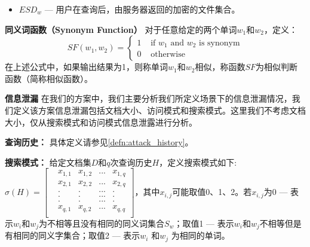 \begin{itemize}
  \item
  $ ESD_w $ --- 用户在查询后，由服务器返回的加密的文件集合。


\end{itemize}

%
%
\textbf{同义词函数（Synonym Function）} 对于任意给定的两个单词$w_1$和$w_2$，定义：
\begin{equation}
SF(w_1, w_2) =
\begin{cases}
1 & \text{ if ${w_1}$ and ${w_2}$ is synonym}
\\
0 & \text{ otherwise }
\end{cases}
\end{equation}
在上述公式中，如果输出结果为1，则称单词$w_1$和$w_2$相似，称函数$SF$为相似判断函数（简称相似函数）。

%
%



%
%
\textbf{信息泄漏} 在我们的方案中，我们主要分析我们所定义场景下的信息泄漏情况，我们定义该方案信息泄漏包括文档大小、访问模式和搜索模式。这里我们不考虑文档大小，仅从搜索模式和访问模式信息泄露进行分析。

\textbf{查询历史：} 具体定义请参见\ref{defn:attack_history}。

\textbf{搜索模式：} 给定文档集$D$和$q$次查询历史$H$，定义搜索模式如下:\\
 $\sigma(H) = \begin{bmatrix}
 &x_{1,1}  &x_{1,2}  &...  &x_{1,q} \\
 &x_{2,1}  &x_{2,2}  &...  &x_{2,q} \\
 & . & .   &...      &. \\
 & . & .   &...      &. \\
 & . & .   &...      &. \\
 &x_{q,1}  &x_{q,2}  &...  &x_{q,q} \\
\end{bmatrix}$，其中$x_{i,j}$可能取值0、1、2。若$x_{i,j}$为0 --- 表示$w_i$和$w_j$为不相等且没有相同的同义词集合$S_w$；取值1 --- 表示$w_i$和$w_j$不相等但是有相同的同义字集合；取值2 --- 表示$w_i$ 和$w_j$ 为相同的单词。

